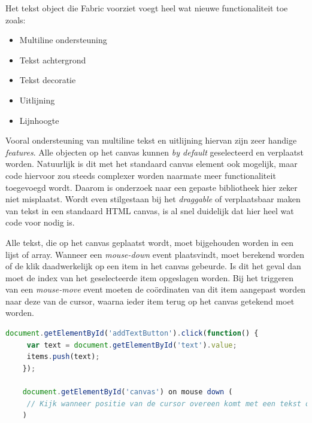 Het tekst object die Fabric voorziet voegt heel wat nieuwe functionaliteit toe zoals: 

\begin{itemize}
	\item Multiline ondersteuning
	\item Tekst achtergrond
	\item Tekst decoratie
	\item Uitlijning
	\item Lijnhoogte
\end{itemize}

Vooral ondersteuning van multiline tekst en uitlijning hiervan zijn zeer handige \textit{features}. Alle objecten op het canvas kunnen \textit{by default} geselecteerd en verplaatst worden. Natuurlijk is dit met het standaard canvas element ook mogelijk, maar code hiervoor zou steeds complexer worden naarmate meer functionaliteit toegevoegd wordt. Daarom is onderzoek naar een gepaste bibliotheek hier zeker niet misplaatst. Wordt even stilgestaan bij het \textit{draggable} of verplaatsbaar maken van tekst in een standaard HTML canvas, is al snel duidelijk dat hier heel wat code voor nodig is. 

Alle tekst, die op het canvas geplaatst wordt, moet bijgehouden worden in een lijst of array. Wanneer een \textit{mouse-down} event plaatsvindt, moet berekend worden of de klik daadwerkelijk op een item in het canvas gebeurde. Is dit het geval dan moet de index van het geselecteerde item opgeslagen worden. Bij het triggeren van een \textit{mouse-move} event moeten de co\"{o}rdinaten van dit item aangepast worden naar deze van de cursor, waarna ieder item terug op het canvas getekend moet worden. 

\begin{lstlisting}[language=javascript]
	document.getElementById('addTextButton').click(function() {
	 var text = document.getElementById('text').value;
	 items.push(text);
	});
	
	document.getElementById('canvas') on mouse down (
	 // Kijk wanneer positie van de cursor overeen komt met een tekst object
	)
\end{lstlisting}

